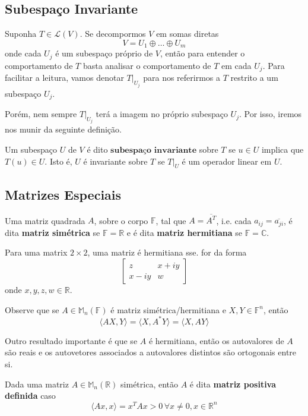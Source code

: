 \documentclass[12pt,a4paper]{article}
\begin{document}

\subsection{Subespaço Invariante}

Suponha $T \in \mathcal{L}(V)$. Se decompormos $V$ em somas diretas
\[
V = U_1 \oplus \ldots \oplus U_m
\]
onde cada $U_j$ é um subespaço próprio de $V$, então para entender o comportamento de $T$ basta analisar o comportamento de $T$ em cada $U_j$. Para facilitar a leitura, vamos denotar $T|_{U_j}$ para nos referirmos a $T$ restrito a um subespaço $U_j$.

Porém, nem sempre $T|_{U_j}$ terá a imagem no próprio subespaço ${U_j}$. Por isso, iremos nos munir da seguinte definição.

Um subespaço $U$ de $V$ é dito $\textbf{subespaço invariante}$ sobre $T$ se $u \in U$ implica que $T(u) \in U$. Isto é, $U$ é invariante sobre $T$ se $T|_U$ é um operador linear em $U$.

\subsection{Matrizes Especiais}

Uma matriz quadrada $A$, sobre o corpo $\mathbb{F}$, tal que $A = \overline{A^T}$, i.e. cada $a_{ij}= \overline{a_{ji}}$, é dita \textbf{matriz simétrica} se $\mathbb{F} = \mathbb{R}$ e é dita \textbf{matriz hermitiana} se $\mathbb{F} = \mathbb{C}$.

Para uma matrix $2 \times 2$, uma matriz é hermitiana sse. for da forma
$$
\begin{bmatrix}
	z & x+iy \\
	x-iy & w
\end{bmatrix}
$$
onde $x, y, z, w \in \mathbb{R}$.

Observe que se $A \in \mathbb{M}_n(\mathbb{F})$ é matriz simétrica/hermitiana e $X,Y \in \mathbb{F}^n$, então 
\[
\langle AX, Y \rangle = \langle X, A^{\ast} Y \rangle = \langle X, A Y \rangle
\]

Outro resultado importante é que se $A$ é hermitiana, então os autovalores de $A$ são reais e os autovetores associados a autovalores distintos são ortogonais entre si.

Dada uma matriz $A \in \mathbb{M}_n(\mathbb{R})$ simétrica, então $A$ é dita \textbf{matriz positiva definida} caso
\[
\langle Ax, x \rangle = x^T A x > 0 \, \forall x \neq 0, x \in \mathbb{R}^n
\]
\end{document}
